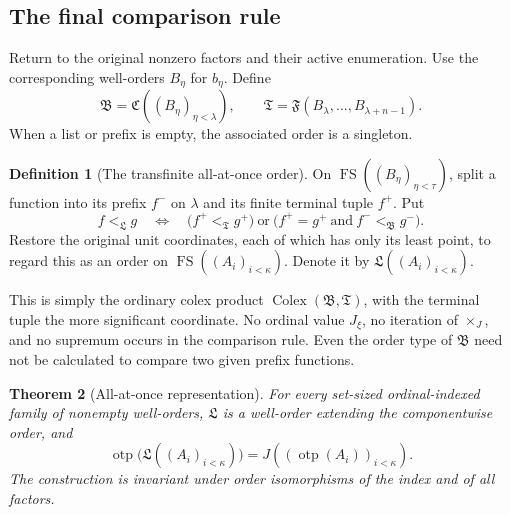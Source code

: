\documentclass[11pt,letterpaper]{article}
\newtheorem{theorem}{Theorem}[section]
\theoremstyle{definition}
\newtheorem{definition}[theorem]{Definition}
\theoremstyle{remark}
\newcommand{\J}{\mathbin{\times_{\!J}}}
\newcommand{\FF}{\mathfrak F}
\newcommand{\LL}{\mathfrak L}
\newcommand{\BB}{\mathfrak B}
\newcommand{\CC}{\mathfrak C}
\newcommand{\otp}{\operatorname{otp}}
\newcommand{\fs}{\operatorname{FS}}
\newcommand{\colex}{\operatorname{Colex}}
\begin{document}
\subsection{The final comparison rule}

Return to the original nonzero factors and their active enumeration.
Use the corresponding well-orders $B_\eta$ for $b_\eta$. Define
\[
 \BB=\CC((B_\eta)_{\eta<\lambda}),\qquad
 \mathfrak T=\FF(B_\lambda,\ldots,B_{\lambda+n-1}).
\]
When a list or prefix is empty, the associated order is a singleton.

\begin{definition}[The transfinite all-at-once order]\label{def:L}
On
$\fs((B_\eta)_{\eta<\tau})$, split a function into its prefix $f^-$
on $\lambda$ and its finite terminal tuple $f^+$. Put
\begin{equation}\label{eq:L-rule}
 f<_{\LL}g\quad\Longleftrightarrow\quad
 \bigl(f^+<_{\mathfrak T}g^+\bigr)
 \ \text{or}\
 \bigl(f^+=g^+\ \text{and}\ f^-<_{\BB}g^-\bigr).
\end{equation}
Restore the original unit coordinates, each of which has only its least
point, to regard this as an order on
$\fs((A_i)_{i<\kappa})$. Denote it by $\LL((A_i)_{i<\kappa})$.
\end{definition}

This is simply the ordinary colex product $\colex(\BB,\mathfrak T)$,
with the terminal tuple the more significant coordinate. No ordinal
value $J_\xi$, no iteration of $\J$, and no supremum occurs in the
comparison rule. Even the order type of $\BB$ need not be calculated to
compare two given prefix functions.

\begin{theorem}[All-at-once representation]\label{thm:transfinite}
For every set-sized ordinal-indexed family of nonempty well-orders,
$\LL$ is a well-order extending the componentwise order, and
\begin{equation}\label{eq:L-type}
 \otp\bigl(\LL((A_i)_{i<\kappa})\bigr)
     =J((\otp(A_i))_{i<\kappa}).
\end{equation}
The construction is invariant under order isomorphisms of the index
and of all factors.
\end{theorem}
\end{document}
